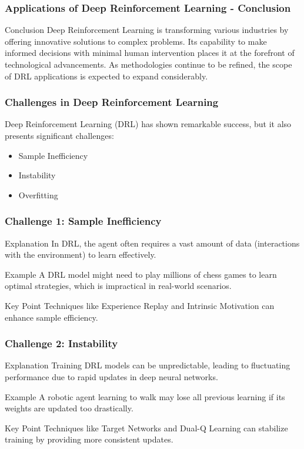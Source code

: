 \documentclass[aspectratio=169]{beamer}
\begin{document}
\begin{frame}[fragile]
    \frametitle{Applications of Deep Reinforcement Learning - Conclusion}
    \begin{block}{Conclusion}
        Deep Reinforcement Learning is transforming various industries by offering innovative solutions to complex problems. Its capability to make informed decisions with minimal human intervention places it at the forefront of technological advancements. As methodologies continue to be refined, the scope of DRL applications is expected to expand considerably.
    \end{block}
\end{frame}

\begin{frame}[fragile]
    \frametitle{Challenges in Deep Reinforcement Learning}
    Deep Reinforcement Learning (DRL) has shown remarkable success, but it also presents significant challenges:
    \begin{itemize}
        \item Sample Inefficiency
        \item Instability
        \item Overfitting
    \end{itemize}
\end{frame}

\begin{frame}[fragile]
    \frametitle{Challenge 1: Sample Inefficiency}
    \begin{block}{Explanation}
        In DRL, the agent often requires a vast amount of data (interactions with the environment) to learn effectively.
    \end{block}
    \begin{exampleblock}{Example}
        A DRL model might need to play millions of chess games to learn optimal strategies, which is impractical in real-world scenarios.
    \end{exampleblock}
    \begin{block}{Key Point}
        Techniques like Experience Replay and Intrinsic Motivation can enhance sample efficiency.
    \end{block}
\end{frame}

\begin{frame}[fragile]
    \frametitle{Challenge 2: Instability}
    \begin{block}{Explanation}
        Training DRL models can be unpredictable, leading to fluctuating performance due to rapid updates in deep neural networks.
    \end{block}
    \begin{exampleblock}{Example}
        A robotic agent learning to walk may lose all previous learning if its weights are updated too drastically.
    \end{exampleblock}
    \begin{block}{Key Point}
        Techniques like Target Networks and Dual-Q Learning can stabilize training by providing more consistent updates.
    \end{block}
\end{frame}
\end{document}
